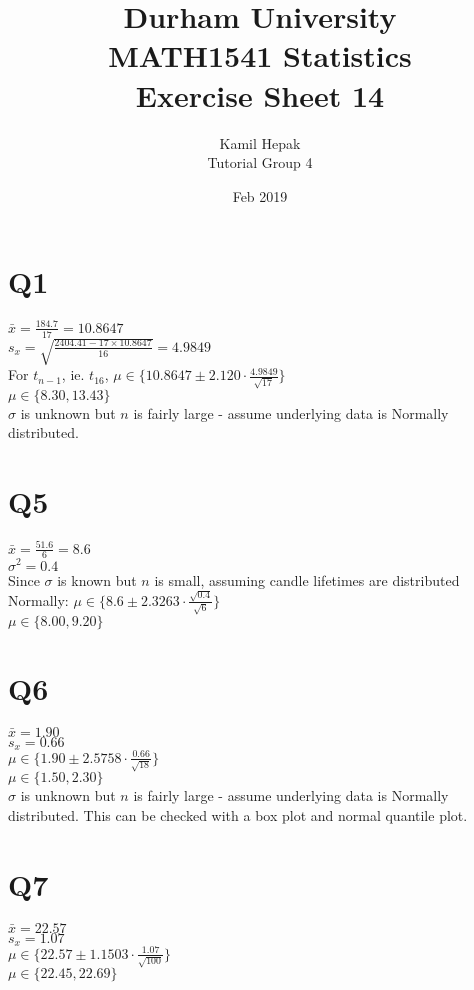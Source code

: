\documentclass[]{article}
\title{\vspace{-3cm}Durham University\\
    MATH1541 Statistics \\
	Exercise Sheet 14}
\author{Kamil Hepak\\
        Tutorial Group 4}
\date{Feb 2019}
\begin{document}
\maketitle
\section{Q1}
$\bar{x} = \frac{184.7}{17} = 10.8647$
\\
$s_x = \sqrt{\frac{2404.41-17\times 10.8647}{16}} = 4.9849$
\\
For $t_{n-1}$, ie. $t_{16}$, $\mu \in \{10.8647 \pm 2.120\cdot\frac{4.9849}{\sqrt{17}}\}$
\\
$\mu \in \{8.30, 13.43\}$
\\
$\sigma$ is unknown but $n$ is fairly large - assume underlying data is Normally distributed.

\section{Q5}
$\bar{x} = \frac{51.6}{6} = 8.6$
\\
$\sigma^2 = 0.4$
\\
Since $\sigma$ is known but $n$ is small, assuming candle lifetimes are distributed Normally: $\mu \in \{8.6 \pm 2.3263\cdot\frac{\sqrt{0.4}}{\sqrt{6}}\}$
\\
$\mu \in \{8.00, 9.20\}$

\section{Q6}
$\bar{x} = 1.90$
\\
$s_x = 0.66$
\\
$\mu \in \{1.90 \pm 2.5758\cdot\frac{0.66}{\sqrt{18}}\}$
\\
$\mu \in \{1.50, 2.30\}$
\\
$\sigma$ is unknown but $n$ is fairly large - assume underlying data is Normally distributed. This can be checked with a box plot and normal quantile plot.

\section{Q7}
$\bar{x} = 22.57$
\\
$s_x = 1.07$
\\
$\mu \in \{22.57 \pm 1.1503\cdot\frac{1.07}{\sqrt{100}}\}$
\\
$\mu \in \{22.45, 22.69\}$
\end{document}
